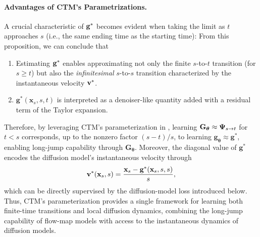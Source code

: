 \paragraph{Advantages of CTM's Parametrizations.}
A crucial characteristic of ${\mathbf{g}}^*$ becomes evident when taking the limit as $t$ approaches $s$ (i.e., the same ending time as the starting time):
From this proposition, we can conclude that
\begin{enumerate}
    \item Estimating ${\mathbf{g}}^*$ enables approximating not only the finite $s$-to-$t$ transition (for $s \ge t$) but also the \textit{infinitesimal} $s$-to-$s$ transition characterized by the instantaneous velocity ${\mathbf{v}}^*$.
    \item $\mathbf{g}^*(\mathbf{x}_{s},s,t)$  is interpreted as a denoiser-like quantity added with a residual term of the Taylor expansion.
\end{enumerate}
Therefore, by leveraging CTM's parameterization in
, learning
$\mathbf{G}_{\bm{\theta}} \approx {\bm{\Psi}}_{s\to t}$ for $t<s$
corresponds, up to the nonzero factor $(s-t)/s$, to learning
$\mathbf{g}_{\bm{\theta}} \approx \mathbf{g}^*$, enabling long-jump
capability through $\mathbf{G}_{\bm{\theta}}$. Moreover, the diagonal
value of $\mathbf{g}^*$ encodes the diffusion model's instantaneous
velocity through
\[
{\mathbf{v}}^*({\mathbf{x}}_s,s)
=
\frac{{\mathbf{x}}_s-{\mathbf{g}}^*({\mathbf{x}}_s,s,s)}{s},
\]
which can be directly supervised by the diffusion-model loss introduced
below. Thus, CTM's parameterization provides a single framework for
learning both finite-time transitions and local diffusion dynamics,
combining the long-jump capability of flow-map models with access to the
instantaneous dynamics of diffusion models.


